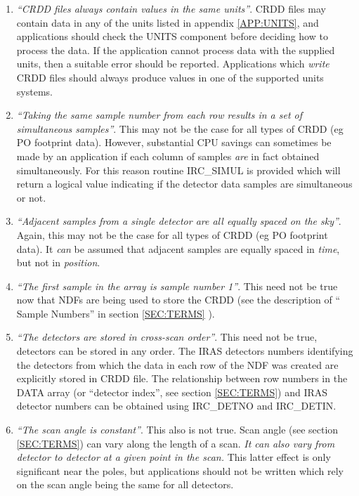 \begin {enumerate}

\item {\em ``CRDD files always contain values in the same units''}. CRDD files
may contain data in any of the units listed in appendix \ref {APP:UNITS}, and
applications should check the UNITS component before deciding how to process the
data. If the application cannot process data with the supplied units, then a
suitable error should be reported. Applications which {\em write} CRDD files
should always produce values in one of the supported units systems.

\item {\em ``Taking the same sample number from each row results in a set of
simultaneous samples''}. This may not be the case for all types of CRDD (eg PO
footprint data). However, substantial CPU savings can sometimes be made by an
application if each column of samples {\em are} in fact obtained simultaneously.
For this reason routine IRC\_SIMUL is provided which will return a logical value
indicating if the detector data samples are simultaneous or not.

\item {\em ``Adjacent samples from a single detector are all equally spaced on
the sky''}. Again, this may not be the case for all types of CRDD (eg PO
footprint data). It {\em can} be assumed that adjacent samples are equally
spaced in {\em time}, but not in {\em position}.

\item {\em ``The first sample in the array is sample number 1''}. This need not
be true now that NDFs are being used to store the CRDD (see the description of
`` Sample Numbers'' in section \ref {SEC:TERMS} ).

\item {\em ``The detectors are stored in cross-scan order''}. This need not be
true, detectors can be stored in any order. The IRAS detectors numbers
identifying the detectors from which the data in each row of the NDF was created
are explicitly stored in CRDD file. The relationship between row numbers in the
DATA array (or ``detector index'', see section \ref {SEC:TERMS}) and IRAS
detector numbers can be obtained using IRC\_DETNO and IRC\_DETIN.

\item {\em ``The scan angle is constant''}. This also is not true. Scan angle
(see section \ref{SEC:TERMS}) can vary along the length of a scan. {\em It can
also vary from detector to detector at a given point in the scan.} This latter
effect is only significant near the poles, but applications should not be
written which rely on the scan angle being the same for all detectors.

\end {enumerate}

